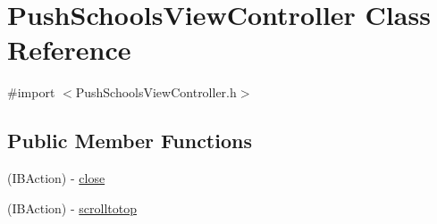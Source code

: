 \hypertarget{interface_push_schools_view_controller}{
\section{\-Push\-Schools\-View\-Controller \-Class \-Reference}
\label{interface_push_schools_view_controller}
}


{\ttfamily \#import $<$\-Push\-Schools\-View\-Controller.\-h$>$}

\subsection*{\-Public \-Member \-Functions}
\begin{DoxyCompactItemize}
\item 
(\-I\-B\-Action) -\/ \hyperlink{interface_push_schools_view_controller_a965e9f8ea30a70b66abc36ca93400b3c}{close}
\item 
(\-I\-B\-Action) -\/ \hyperlink{interface_push_schools_view_controller_aa6e504db4dcd6d81fef3ea39610d77dd}{scrolltotop}
\end{DoxyCompactItemize}
